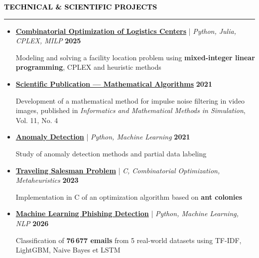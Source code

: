 \documentclass[10pt,english,french]{article}
\newcommand{\itProjectIcon}[1][black]{\textcolor{#1}{\faLaptopCode}}
\newcommand{\cvsection}[1]{
    \vspace{4pt}
    \textbf{\fontsize{9pt}{10pt}\selectfont \textcolor{black}{#1}}
    \vspace{6pt}
    \hrule
    \vspace{6pt}
}
\begin{document}
\vspace{-4pt}
\vspace{-4pt}
\cvsection{\itProjectIcon[black]\hspace{4pt}TECHNICAL \& SCIENTIFIC PROJECTS}

\vspace{-7pt}
\begin{itemize}[leftmargin=0.5cm, label=\textbullet, itemsep=0.12em]
    \item \href{https://github.com/DmytroPalahin/logistics-center-placement}
          {\textbf{Combinatorial Optimization of Logistics Centers}} |
          \textit{Python, Julia, CPLEX, MILP} \hfill \textbf{2025}

          Modeling and solving a facility location problem using
          \textbf{mixed-integer linear programming}, CPLEX and heuristic methods

    \item \href{https://www.researchsquare.com/article/rs-2203260/v1}
          {\textbf{Scientific Publication --- Mathematical Algorithms}} \hfill \textbf{2021}

          Development of a mathematical method for impulse noise filtering in video images,
          published in \textit{Informatics and Mathematical Methods in Simulation}, Vol. 11, No. 4

    \item \href{https://github.com/DmytroPalahin/Anomaly_Detection}
          {\textbf{Anomaly Detection}} | \textit{Python, Machine Learning} \hfill \textbf{2021}

          Study of anomaly detection methods and partial data labeling

    \item \href{https://github.com/DmytroPalahin/Probleme_du_Voyageur_de_Commerce}
          {\textbf{Traveling Salesman Problem}} |
          \textit{C, Combinatorial Optimization, Metaheuristics} \hfill \textbf{2023}

          Implementation in C of an optimization algorithm based on \textbf{ant colonies}

    \item \href{https://github.com/DmytroPalahin/phishing-email-detection}
          {\textbf{Machine Learning Phishing Detection}} |
          \textit{Python, Machine Learning, NLP} \hfill \textbf{2026}

          Classification of \textbf{76\,677 emails} from 5 real-world datasets using
          TF-IDF, LightGBM, Naive Bayes et LSTM
\end{itemize}
\end{document}
